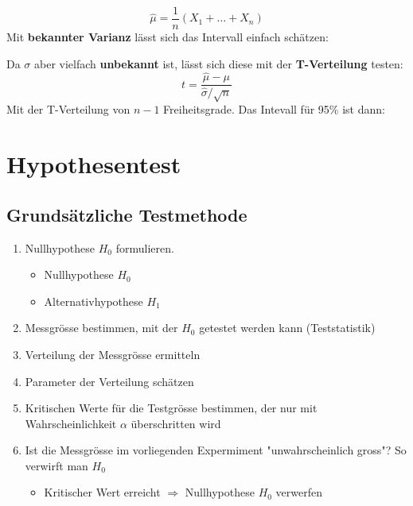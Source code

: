 \documentclass[../Main.tex]{subfiles}
\begin{document}
\begin{equation}
    \hat{\mu} = \frac{1}{n}(X_1+\dots+X_n)
\end{equation} 
Mit \textbf{bekannter Varianz} lässt sich das Intervall einfach schätzen:
\begin{equation}
    [\hat{\mu}-1.96\frac{\sigma}{\sqrt{n}},\hat{\mu}+1.96\frac{\sigma}{\sqrt{n}}]
\end{equation}

Da \(\sigma\) aber vielfach \textbf{unbekannt} ist, lässt sich diese mit der \textbf{T-Verteilung} testen:
\begin{equation}
    t = \frac{\hat{\mu}-\mu}{\hat{\sigma}/\sqrt{n}}
\end{equation} 
Mit der T-Verteilung von \(n-1\) Freiheitsgrade. Das Intevall für 95\% ist dann:
\begin{equation}
    [\hat{\mu}+t_{-}\frac{\sigma}{\sqrt{n}},\hat{\mu}+t_{+}\frac{\sigma}{\sqrt{n}}]
\end{equation}


\section{Hypothesentest}
\subsection{Grundsätzliche Testmethode}
\begin{enumerate}
    \item Nullhypothese \(H_0\) formulieren.
    \begin{itemize}
        \item Nullhypothese \(H_0\)
        \item Alternativhypothese \(H_1\)
    \end{itemize}
    \item Messgrösse bestimmen, mit der \(H_0\) getestet werden kann (Teststatistik)
    \item Verteilung der Messgrösse ermitteln
    \item Parameter der Verteilung schätzen
    \item Kritischen Werte für die Testgrösse bestimmen, der nur mit Wahrscheinlichkeit \(\alpha\) überschritten wird
    \item Ist die Messgrösse im vorliegenden Expermiment "unwahrscheinlich gross"? So verwirft man \(H_0\)
    \begin{itemize}
        \item Kritischer Wert erreicht \(\Rightarrow\) Nullhypothese \(H_0\) verwerfen
    \end{itemize}
\end{enumerate}
\end{document}
